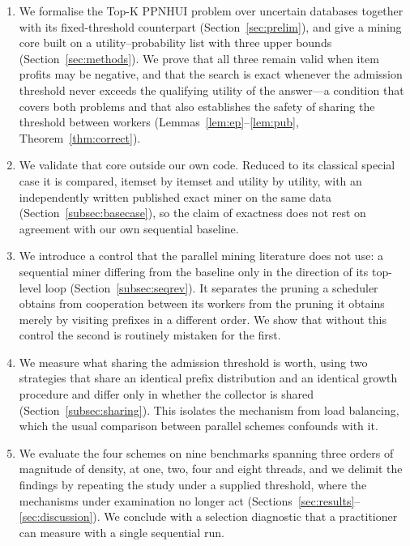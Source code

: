 \documentclass[pdflatex,sn-vancouver-num]{sn-jnl}
\theoremstyle{thmstyleone}%
\theoremstyle{thmstyletwo}%
\theoremstyle{thmstylethree}%
\newcommand{\Kk}{\mathrm{K}}
\begin{document}
\begin{enumerate}
\item We formalise the Top-$\Kk$ PPNHUI problem over uncertain databases
      together with its fixed-threshold counterpart
      (Section~\ref{sec:prelim}), and give a mining core built on a
      utility--probability list with three upper bounds
      (Section~\ref{sec:methods}). We prove that all three remain valid
      when item profits may be negative, and that the search is exact
      whenever the admission threshold never exceeds the qualifying
      utility of the answer---a condition that covers both problems and
      that also establishes the safety of sharing the threshold between
      workers (Lemmas~\ref{lem:ep}--\ref{lem:pub},
      Theorem~\ref{thm:correct}).
 
\item We validate that core outside our own code. Reduced to its
      classical special case it is compared, itemset by itemset and
      utility by utility, with an independently written published exact
      miner on the same data (Section~\ref{subsec:basecase}), so the
      claim of exactness does not rest on agreement with our own
      sequential baseline.
 
\item We introduce a control that the parallel mining literature does
      not use: a sequential miner differing from the baseline only in the
      direction of its top-level loop (Section~\ref{subsec:seqrev}). It
      separates the pruning a scheduler obtains from cooperation between
      its workers from the pruning it obtains merely by visiting prefixes
      in a different order. We show that without this control the second
      is routinely mistaken for the first.
 
\item We measure what sharing the admission threshold is worth, using
      two strategies that share an identical prefix distribution and an
      identical growth procedure and differ only in whether the collector
      is shared (Section~\ref{subsec:sharing}). This isolates the
      mechanism from load balancing, which the usual comparison between
      parallel schemes confounds with it.
 
\item We evaluate the four schemes on nine benchmarks spanning three
      orders of magnitude of density, at one, two, four and eight
      threads, and we delimit the findings by repeating the study under
      a supplied threshold, where the mechanisms under examination no
      longer act (Sections~\ref{sec:results}--\ref{sec:discussion}). We
      conclude with a selection diagnostic that a practitioner can
      measure with a single sequential run.
\end{enumerate}
\end{document}
